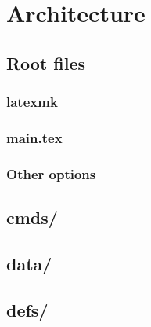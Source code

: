 \newpage
\section{Architecture}
\label{sec:tutorial/architecture}


    \subsection{Root files}
    \label{sec:tutorial/architecture/root}
    
    
        \subsubsection*{\thesubsubsection\hspace{1em}latexmk}
        \label{sec:tutorial/architecture/root/latexmkrc}
        
    
        \subsubsection{main.tex}
        \label{sec:tutorial/architecture/root/main}
        
        
        \subsubsection{Other options}
        \label{sec:tutorial/architecture/root/other}
        
    
    \subsection{cmds/}
    \label{sec:tutorial/architecture/cmds}
    
    
    \subsection{data/}
    \label{sec:tutorial/architecture/data}
    
    
    \subsection{defs/}
    \label{sec:tutorial/architecture/defs}
    
    
